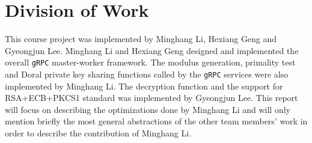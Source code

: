 \section{Division of Work }

This course project was implemented by Minghang Li, Hexiang Geng and Gyeongjun Lee. Minghang Li and Hexiang Geng designed and implemented the overall \texttt{gRPC} master-worker framework. The modulus generation, primality test and Doral private key sharing functions called by the \texttt{gRPC} services were also implemented by Minghang Li. The decryption function and the support for RSA+ECB+PKCS1 standard was implemented by Gyeongjun Lee. This report will focus on describing the optimizations done by Minghang Li and will only mention briefly the most general abstractions of the other team members' work in order to describe the contribution of Minghang Li.
